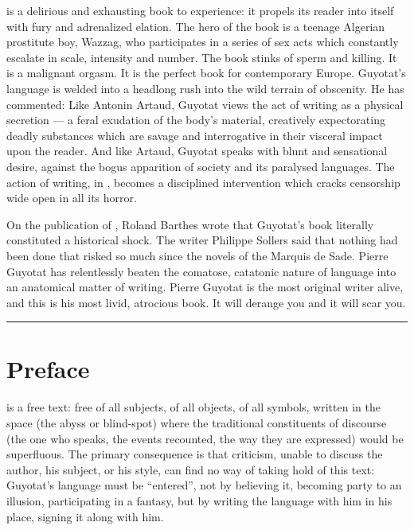 \documentclass[10pt,twoside]{memoir}
\begin{document}
 is a delirious and exhausting book to experience: it propels its reader
into itself with fury and adrenalized elation. The hero of the book is a teenage Algerian prostitute
boy, Wazzag, who participates in a series of sex acts which constantly escalate in scale, intensity
and number. The book stinks of sperm and killing. It is a malignant orgasm. It is the perfect book
for contemporary Europe. Guyotat's language is welded into a headlong rush into the wild terrain of
obscenity. He has commented:  Like Antonin Artaud, Guyotat views the act of writing as a
physical secretion --- a feral exudation of the body's material, creatively expectorating deadly
substances which are savage and interrogative in their visceral impact upon the reader. And like
Artaud, Guyotat speaks with blunt and sensational desire, against the bogus apparition of society
and its paralysed languages. The action of writing, in , becomes a
disciplined intervention which cracks censorship wide open in all its horror.

On the publication of , Roland Barthes wrote that Guyotat's book literally
constituted a historical shock. The writer Philippe Sollers said that nothing had been done that
risked so much since the novels of the Marquis de Sade. Pierre Guyotat has relentlessly beaten the
comatose, catatonic nature of language into an anatomical matter of writing. Pierre Guyotat is the
most original writer alive, and this is his most livid, atrocious book. It will derange you and it
will scar you.

\plainbreak{2}


\chapter{Preface}

 is a free text: free of all subjects, of all objects, of all symbols,
written in the space (the abyss or blind-spot) where the traditional constituents of discourse (the
one who speaks, the events recounted, the way they are expressed) would be superfluous. The primary
consequence is that criticism, unable to discuss the author, his subject, or his style, can find no
way of taking hold of this text: Guyotat's language must be \enquote{entered}, not by believing it,
becoming party to an illusion, participating in a fantasy, but by writing the language with him in
his place, signing it along with him.
\end{document}
